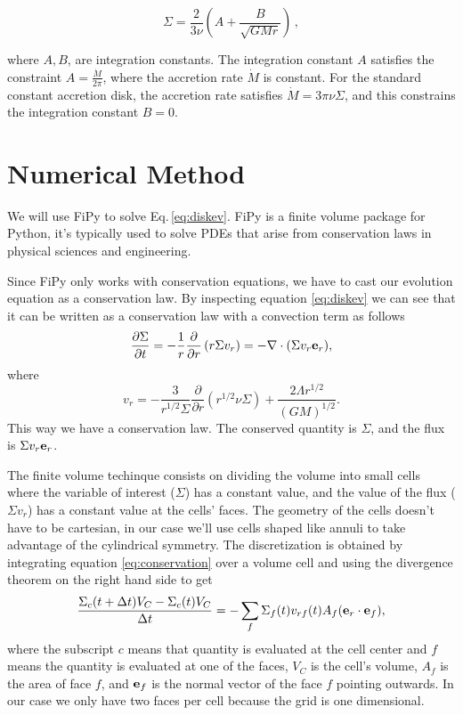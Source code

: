 \documentclass{article}
\begin{document}
\begin{equation}
\Sigma = \frac{2}{3 \nu} \left(A+  \frac{B}{\sqrt{G M r}}\right)\,,
\end{equation}

where $A, B$, are integration constants. The integration constant $A$ satisfies the constraint $A = \frac{\dot{M}}{2\pi}$, where the accretion rate $\dot{M}$ is constant. For the standard constant accretion disk, the accretion rate satisfies $\dot{M} = 3\pi \nu \Sigma$, and this constrains the integration constant $B = 0$.

\section{Numerical Method}

We will use FiPy to solve Eq.\,\ref{eq:diskev}. FiPy is a finite volume package for Python, it's typically used to
solve PDEs that arise from conservation laws in physical sciences and engineering.

Since FiPy only works with conservation equations, we have to cast our evolution equation as a conservation law.
By inspecting equation \ref{eq:diskev} we can see that it can be written as a conservation law with a convection 
term as follows
\begin{equation} \label{eq:conservation}
\frac{\partial \Sigma}{\partial t} = -\frac{1}{r} \frac{\partial}{\partial r} \left( r \Sigma v_{r}\right)=-\nabla\cdot (\Sigma v_r \bold{e}_{r}),
\end{equation}
where
\begin{equation} \label{eq:vr}
v_r = -\frac{3}{r^{1/2}\Sigma} \frac{\partial}{\partial r} \left(r^{1/2} \nu \Sigma\right) + \frac{2 \Lambda r^{1/2}}{(G M)^{1/2}}.
\end{equation}
This way we have a conservation law. The conserved quantity is $\Sigma$, and the flux is $\Sigma v_r \bold{e}_r$.

The finite volume techinque consists on dividing the volume into small cells where the variable of interest ($\Sigma$) has a constant value,
and the value of the flux ($\Sigma v_r$) has a constant value at the cells' faces. The geometry of the cells doesn't have to be cartesian, in
our case we'll use cells shaped like annuli to take advantage of the cylindrical symmetry.
The discretization is obtained by integrating equation \ref{eq:conservation} over a volume cell and using the divergence theorem on the
right hand side to get
\begin{equation} \label{eq:discretization}
\frac{\Sigma_c(t+\Delta t) V_C - \Sigma_c(t) V_C}{\Delta t} =
-\sum_{f} \Sigma_{f}(t) v_{rf}(t) A_{f} (\bold{e}_r \cdot \bold{e}_{f}),
\end{equation}
where the subscript $c$ means that quantity is evaluated at the cell center and $f$ means the quantity is evaluated at one of the faces,
$V_C$ is the cell's volume, $A_f$ is the area of face $f$, and $\bold{e}_{f}$ is the normal vector of the face $f$ pointing outwards.
In our case we only have two faces per cell because the grid is one 
dimensional.
\end{document}
